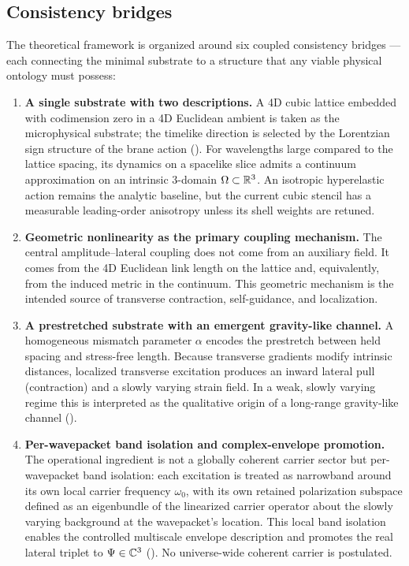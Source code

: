 \subsection{Consistency bridges}
\label{subsec:consistency-bridges}
The theoretical framework is organized around six coupled consistency bridges --- each connecting the minimal substrate to a structure that any viable physical ontology must possess:
\begin{enumerate}
\item \textbf{A single substrate with two descriptions.}
A 4D cubic lattice embedded with codimension zero in a 4D Euclidean ambient is taken as the microphysical substrate; the timelike direction is selected by the Lorentzian sign structure of the brane action ().
For wavelengths large compared to the lattice spacing, its dynamics on a spacelike slice admits a continuum approximation on an intrinsic $3$-domain $\Omega\subset\mathbb{R}^3$. An isotropic hyperelastic action remains the analytic
baseline, but the current cubic stencil has a measurable leading-order anisotropy unless its shell weights are retuned.

\item \textbf{Geometric nonlinearity as the primary coupling mechanism.}
The central amplitude--lateral coupling does not come from an auxiliary field.
It comes from the 4D Euclidean link length on the lattice and, equivalently, from the induced metric in the continuum.
This geometric mechanism is the intended source of transverse contraction, self-guidance, and localization.

\item \textbf{A prestretched substrate with an emergent gravity-like channel.}
A homogeneous mismatch parameter $\alpha$ encodes the prestretch between held spacing and stress-free length.
Because transverse gradients modify intrinsic distances, localized transverse excitation produces an inward lateral pull
(contraction) and a slowly varying strain field.
In a weak, slowly varying regime this is interpreted as the qualitative origin of a long-range gravity-like channel
().

\item \textbf{Per-wavepacket band isolation and complex-envelope promotion.}
The operational ingredient is not a globally coherent carrier sector but per-wavepacket band isolation:
each excitation is treated as narrowband around its own local carrier frequency $\omega_0$, with its own
retained polarization subspace defined as an eigenbundle of the linearized carrier operator about the
slowly varying background at the wavepacket's location.
This local band isolation enables the controlled multiscale envelope description and promotes the real
lateral triplet to $\Psi\in\mathbb{C}^3$ ().
No universe-wide coherent carrier is postulated.


\end{enumerate}
